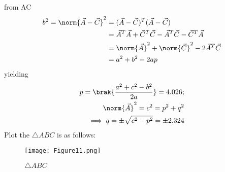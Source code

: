 \documentclass[journal,12pt,twocolumn]{IEEEtran}
\begin{document}
from AC 
\begin{align}
b^2=\norm{\vec{A}-\vec{C}}^2&=({\vec{A}-\vec{C}})^T({\vec{A}-\vec{C}})
\\
&= \vec{A}^T\vec{A}+\vec{C}^T\vec{C}-\vec{A}^T\vec{C} - \vec{C}^T\vec{A}
\\
&= \norm{\vec{A}}^2 + \norm{\vec{C}}^2 - 2\vec{A}^T\vec{C}
\\
&= a^2 + b^2-2ap
\end{align}
yielding
\\
\begin{align}
p=\brak{\frac{a^2+c^2-b^2}{2a}}=4.026;
\\
\norm{\vec{A}}^2 =c^2=p^2+q^2
\\
\implies q=\pm{\sqrt{c^2-p^2}}=\pm{2.324}
\end{align}
Plot the $\triangle ABC$ is as follows:
\begin{figure}[h!]
\centering
\texttt{[image: Figure11.png]}
\caption{$\triangle ABC$}
\label{fig:$\triangle ABC$}
\end{figure}
\end{document}
